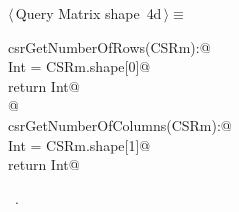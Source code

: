 \documentclass[11pt,oneside]{article}	%
\begin{document}
\begin{flushleft} \small
\begin{minipage}{\linewidth} \label{scrap8}
\protect{}$\langle\,$Query Matrix shape\nobreak\ {\footnotesize 4d}$\,\rangle\equiv$
\vspace{-1ex}
\begin{list}{}{} \item
\mbox{}\verb@def csrGetNumberOfRows(CSRm):@\\
\mbox{}\verb@    Int = CSRm.shape[0]@\\
\mbox{}\verb@    return Int@\\
\mbox{}\verb@    @\\
\mbox{}\verb@def csrGetNumberOfColumns(CSRm):@\\
\mbox{}\verb@    Int = CSRm.shape[1]@\\
\mbox{}\verb@    return Int@\\
\mbox{}\verb@@{\NWsep}
\end{list}
\vspace{-1ex}
\footnotesize\addtolength{\baselineskip}{-1ex}
\begin{list}{}{\setlength{\itemsep}{-\parsep}\setlength{\itemindent}{-\leftmargin}}
\item \NWtxtMacroRefIn\ .
\end{list}
\end{minipage}\\[4ex]
\end{flushleft}
\end{document}
